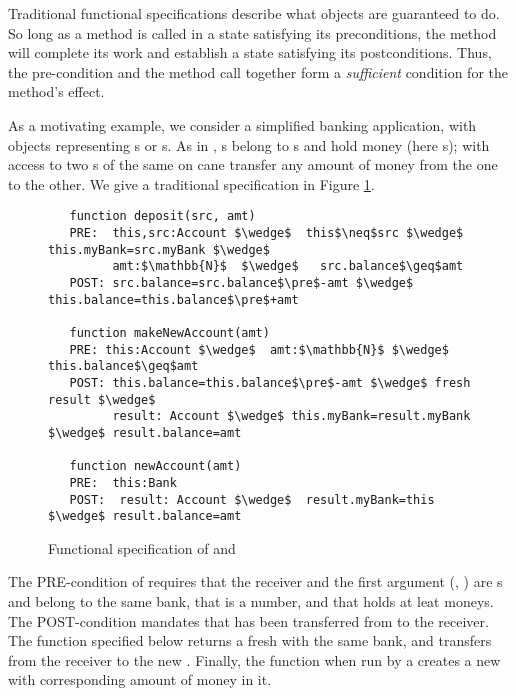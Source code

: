   
Traditional functional specifications describe what objects are
guaranteed to do. 
So long as a method is called in a state satisfying
its preconditions, the method will complete its work and establish a
state satisfying its postconditions.  
Thus, the pre-condition and the method call together form a \emph{sufficient}
condition for the method's effect.

As a motivating example, we consider a simplified banking application,
with objects representing s or s. 
As in \cite{ELang},   s belong to s and hold money (here s);  
with access  to two s of the same   on cane transfer any amount of money from
the one to the other.  We give a traditional specification in Figure \ref{fig:BankSpec}.

\begin{figure}[htbp] 
\begin{lstlisting}
   function deposit(src, amt)
   PRE:  this,src:Account $\wedge$  this$\neq$src $\wedge$ this.myBank=src.myBank $\wedge$ 
         amt:$\mathbb{N}$  $\wedge$   src.balance$\geq$amt
   POST: src.balance=src.balance$\pre$-amt $\wedge$ this.balance=this.balance$\pre$+amt

   function makeNewAccount(amt)
   PRE: this:Account $\wedge$  amt:$\mathbb{N}$ $\wedge$  this.balance$\geq$amt
   POST: this.balance=this.balance$\pre$-amt $\wedge$ fresh result $\wedge$ 
         result: Account $\wedge$ this.myBank=result.myBank $\wedge$ result.balance=amt

   function newAccount(amt)
   PRE:  this:Bank  
   POST:  result: Account $\wedge$  result.myBank=this $\wedge$ result.balance=amt
 \end{lstlisting}
 \vspace{-.8cm}
\caption{Functional specification of  and }
\label{fig:functionalSpecBankAccount}
\label{fig:BankSpec}
\end{figure} 

The PRE-condition of  requires that  the receiver and the first argument  (, ) are s
and belong to the same bank,
that  is a number, and that  holds at leat  moneys.
The POST-condition mandates that  has been transferred from  to the receiver.
 The function  specified below returns a fresh  with the same bank, and transfers 
 from the receiver  to the new .
 Finally, the function  when run by a  creates a new  with corresponding 
 amount of money in it.


